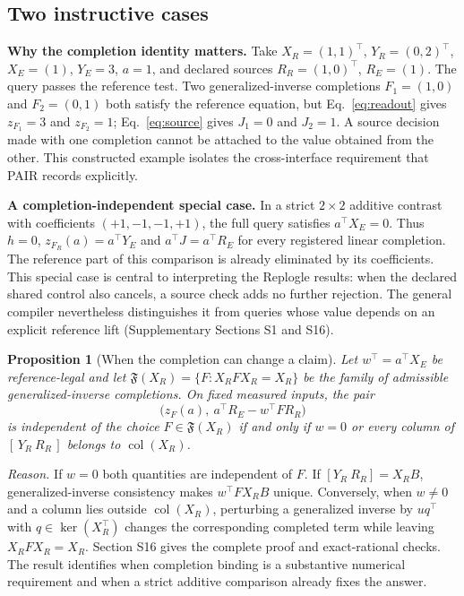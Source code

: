 \documentclass[preprint,11pt,times,number,sort&compress]{elsarticle}
\newtheorem{proposition}{Proposition}
\DeclareMathOperator{\col}{col}
\begin{document}
\subsection{Two instructive cases}
\textbf{Why the completion identity matters.} Take $X_R=(1,1)^\top$, $Y_R=(0,2)^\top$, $X_E=(1)$, $Y_E=3$, $a=1$, and declared sources $R_R=(1,0)^\top$, $R_E=(1)$. The query passes the reference test. Two generalized-inverse completions $F_1=(1,0)$ and $F_2=(0,1)$ both satisfy the reference equation, but Eq.~\ref{eq:readout} gives $z_{F_1}=3$ and $z_{F_2}=1$; Eq.~\ref{eq:source} gives $J_1=0$ and $J_2=1$. A source decision made with one completion cannot be attached to the value obtained from the other. This constructed example isolates the cross-interface requirement that PAIR records explicitly.

\textbf{A completion-independent special case.} In a strict $2\times2$ additive contrast with coefficients $(+1,-1,-1,+1)$, the full query satisfies $a^\top X_E=0$. Thus $h=0$, $z_{F_R}(a)=a^\top Y_E$ and $a^\top J=a^\top R_E$ for every registered linear completion. The reference part of this comparison is already eliminated by its coefficients. This special case is central to interpreting the Replogle results: when the declared shared control also cancels, a source check adds no further rejection. The general compiler nevertheless distinguishes it from queries whose value depends on an explicit reference lift (Supplementary Sections S1 and S16).

\begin{proposition}[When the completion can change a claim]\label{prop:operator-independence}
Let $w^\top=a^\top X_E$ be reference-legal and let $\mathfrak F(X_R)=\{F:X_RFX_R=X_R\}$ be the family of admissible generalized-inverse completions. On fixed measured inputs, the pair
\[
\big(z_F(a),\ a^\top R_E-w^\top FR_R\big)
\]
is independent of the choice $F\in\mathfrak F(X_R)$ if and only if $w=0$ or every column of $[\,Y_R\ R_R\,]$ belongs to $\col(X_R)$.
\end{proposition}
\noindent\emph{Reason.} If $w=0$ both quantities are independent of $F$. If $[Y_R\ R_R]=X_RB$, generalized-inverse consistency makes $w^\top FX_RB$ unique. Conversely, when $w\ne0$ and a column lies outside $\col(X_R)$, perturbing a generalized inverse by $u q^\top$ with $q\in\ker(X_R^\top)$ changes the corresponding completed term while leaving $X_RFX_R=X_R$. Section S16 gives the complete proof and exact-rational checks. The result identifies when completion binding is a substantive numerical requirement and when a strict additive comparison already fixes the answer.
\end{document}
